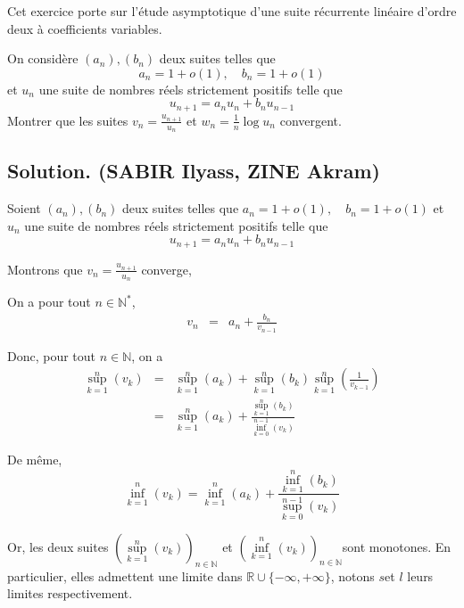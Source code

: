 Cet exercice porte sur l'{\'e}tude asymptotique d'une suite r{\'e}currente
lin{\'e}aire d'ordre deux {\`a} coefficients variables.
\begin{exercise}[]
On consid{\`e}re $(a_n), (b_n)$ deux suites telles que
\[ a_n = 1 + o (1), \quad b_n = 1 + o (1) \]
et $u_n$ une suite de nombres r{\'e}els strictement positifs telle que
\[ u_{n + 1} = a_n u_n + b_n u_{n - 1} \]
Montrer que les suites $v_n = \frac{u_{n + 1}}{u_n}$ et $w_n = \frac{1}{n}
\log u_n$ convergent.
\end{exercise}

\subsection*{Solution. (SABIR Ilyass, ZINE Akram)}


Soient $(a_n), (b_n)$ deux suites telles que $a_n = 1 + o (1), \quad b_n = 1 +
o (1)$ et $u_n$ une suite de nombres r{\'e}els strictement positifs telle que
\[ u_{n + 1} = a_n u_n + b_n u_{n - 1} \]


Montrons que $v_n = \frac{u_{n + 1}}{u_n}$ converge,

On a pour tout $n \in \mathbb{N}^{\ast}$,
\begin{eqnarray*}
  v_n & = & a_n + \frac{b_n}{v_{n - 1}} 
\end{eqnarray*}


Donc, pour tout $n \in \mathbb{N}$, on a
\begin{eqnarray*}
  \underset{k = 1}{\overset{n}{\sup}} (v_k) & = & \underset{k =
  1}{\overset{n}{\sup}} (a_k) + \underset{k = 1}{\overset{n}{\sup}} (b_k)
  \underset{k = 1}{\overset{n}{\sup}} \left( \frac{1}{v_{k - 1}} \right)\\
  & = & \underset{k = 1}{\overset{n}{\sup}} (a_k) + \frac{\underset{k =
  1}{\overset{n}{\sup}} (b_k)}{\underset{k = 0}{\overset{n - 1}{\inf}} (v_k)}
\end{eqnarray*}


De m{\^e}me,
\[ \underset{k = 1}{\overset{n}{\inf}} (v_k) = \underset{k =
   1}{\overset{n}{\inf}} (a_k) + \frac{\underset{k = 1}{\overset{n}{\inf}}
   (b_k)}{\underset{k = 0}{\overset{n - 1}{\sup}} (v_k)} \]


Or, les deux suites $\left( \underset{k = 1}{\overset{n}{\sup}} (v_k)
\right)_{n \in \mathbb{N}}$ et $\left( \underset{k = 1}{\overset{n}{\inf}}
(v_k) \right)_{n \in \mathbb{N}}$sont monotones. En particulier, elles
admettent une limite dans $\mathbb{R} \cup \{ - \infty, + \infty \}$, notons
$s$et $l$ leurs limites respectivement.

